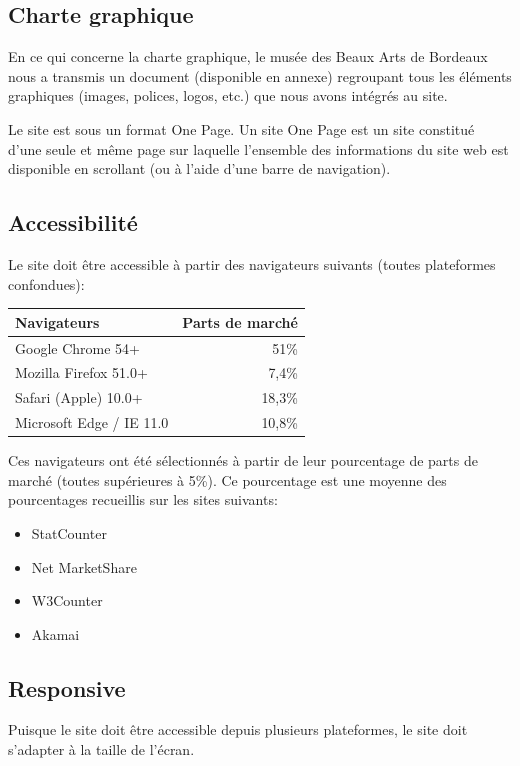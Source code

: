 \documentclass[11pt]{report}
\begin{document}
\subsection*{Charte graphique}

En ce qui concerne la charte graphique, le musée des Beaux Arts de Bordeaux nous a transmis un document (disponible en annexe) regroupant tous les éléments graphiques (images, polices, logos, etc.) que nous avons intégrés au site.

Le site est sous un format One Page. Un site One Page est un site constitué
d'une seule et même page sur laquelle l'ensemble des informations du site web
est disponible en scrollant (ou à l'aide d'une barre de navigation).

\subsection*{Accessibilité}

Le site doit être accessible à partir des navigateurs suivants (toutes plateformes confondues):
\begin{center}
	\begin{tabular}{|l | r|} 
		\hline
		Navigateurs & Parts de marché \\ 
		\hline
		\hline
		Google Chrome 54+ & 51\%  \\ 			
		\hline
		Mozilla Firefox 51.0+ & 7,4\% \\		
		\hline
		Safari (Apple) 10.0+ & 18,3\% \\ 
		\hline
		Microsoft Edge / IE 11.0 & 10,8\% \\
		\hline
	\end{tabular}
\end{center}
Ces navigateurs ont été sélectionnés à partir de leur pourcentage de parts de marché (toutes supérieures à 5\%). Ce pourcentage est une moyenne des pourcentages recueillis sur les sites suivants:
\begin{itemize}
	\item StatCounter
	\item Net MarketShare
	\item W3Counter
	\item Akamai
\end{itemize}

\subsection*{Responsive}
Puisque le site doit être accessible depuis plusieurs plateformes, le site doit s'adapter à la taille de l'écran.
\end{document}
